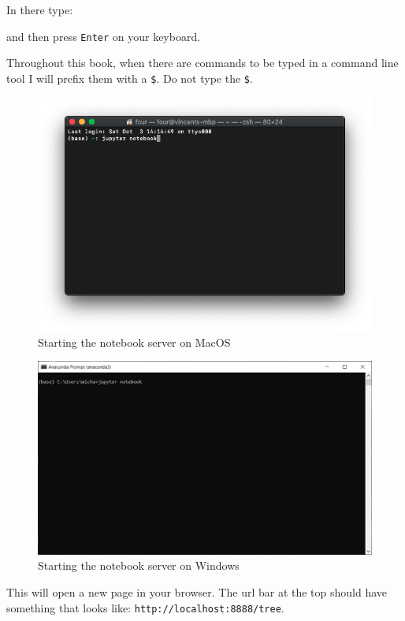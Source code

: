 In there type:


and then press \texttt{Enter} on your keyboard.

Throughout this book, when there are commands to be typed in a command line
tool I will prefix them with a \texttt{\$}. Do not type the \texttt{\$}.

\begin{figure}[htbp]
\centering

    \includegraphics[width=0.750\linewidth]{assets/starting_the_notebook_server/main.png}
    \caption{Starting the notebook server on
    MacOS}\label{fig:starting-the-notebook-server}
\end{figure}

\begin{figure}[htbp]
\centering

    \includegraphics[width=0.750\linewidth]{assets/starting_the_notebook_server_windows/main.png}
    \caption{Starting the notebook server on
    Windows}\label{fig:starting-the-notebook-server-windows}
\end{figure}

This will open a new page in your browser. The url bar at the top should have
something that looks like: \texttt{http://localhost:8888/tree}.


